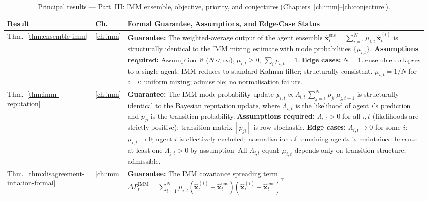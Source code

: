 \documentclass[12pt,openany]{book}
\numberwithin{equation}{chapter}
\theoremstyle{plain}
\theoremstyle{definition}
\theoremstyle{remark}
\begin{document}
\begin{table}[H]
\centering
\caption{Principal results --- Part~III: IMM ensemble,
         objective, priority, and conjectures
         (Chapters~\ref{ch:imm}--\ref{ch:conjecture}).}
\label{tab:summary-c}
\small
\begin{tabularx}{\linewidth}{@{} l l X @{}}
\toprule
\textbf{Result} & \textbf{Ch.} & \textbf{Formal Guarantee,
  Assumptions, and Edge-Case Status} \\
\midrule
Thm.~\ref{thm:ensemble-imm}
  & \ref{ch:imm}
  & \textbf{Guarantee:} The weighted-average output of the agent
    ensemble
    $\hat{\mathbf{x}}^{\mathrm{ens}}_t = \sum_{i=1}^{N} \mu_{i,t}\,\hat{\mathbf{x}}^{(i)}_t$
    is structurally identical to the IMM mixing estimate with
    mode probabilities $\{\mu_{i,t}\}$.
    \newline
    \textbf{Assumptions required:} Assumption~8 ($N < \infty$);
    $\mu_{i,t} \ge 0$; $\sum_i \mu_{i,t} = 1$.
    \newline
    \textbf{Edge cases:} $N = 1$: ensemble collapses to a single
    agent; IMM reduces to standard Kalman filter; structurally
    consistent.  $\mu_{i,t} = 1/N$ for all $i$: uniform mixing;
    admissible; no normalisation failure. \\
\midrule
Thm.~\ref{thm:imm-reputation}
  & \ref{ch:imm}
  & \textbf{Guarantee:} The IMM mode-probability update
    $\mu_{i,t} \propto \Lambda_{i,t}\,\sum_{j=1}^{N} p_{ji}\,\mu_{j,t-1}$
    is structurally identical to the Bayesian reputation update,
    where $\Lambda_{i,t}$ is the likelihood of agent $i$'s
    prediction and $p_{ji}$ is the transition probability.
    \newline
    \textbf{Assumptions required:} $\Lambda_{i,t} > 0$ for all
    $i,t$ (likelihoods are strictly positive); transition matrix
    $[p_{ji}]$ is row-stochastic.
    \newline
    \textbf{Edge cases:} $\Lambda_{i,t} \to 0$ for some $i$:
    $\mu_{i,t} \to 0$; agent $i$ is effectively excluded;
    normalisation of remaining agents is maintained because
    at least one $\Lambda_{j,t} > 0$ by assumption.
    All $\Lambda_{i,t}$ equal: $\mu_{i,t}$ depends only on
    transition structure; admissible. \\
\midrule
Thm.~\ref{thm:disagreement-inflation-formal}
  & \ref{ch:imm}
  & \textbf{Guarantee:} The IMM covariance spreading term
    $\Delta P^{\mathrm{IMM}}_t = \sum_{i=1}^{N} \mu_{i,t}(\hat{\mathbf{x}}^{(i)}_t - \hat{\mathbf{x}}^{\mathrm{ens}}_t)(\hat{\mathbf{x}}^{(i)}_t - \hat{\mathbf{x}}^{\mathrm{ens}}_t)^\top$

\end{tabularx}
\end{table}
\end{document}
